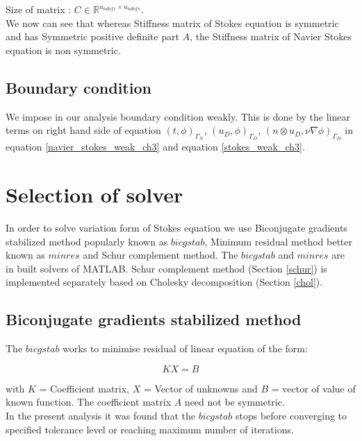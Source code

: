 \documentclass[a4paper]{book}
\begin{document}
Size of matrix : $C \in \mathbb{R}^{u_{ndofs} \times u_{ndofs}}$. \\

We now can see that whereas Stiffness matrix of Stokes equation is symmetric and has Symmetric positive definite part $A$, the Stiffness matrix of Navier Stokes equation is non symmetric.

\subsection{Boundary condition}

We impose in our analysis boundary condition weakly. This is done by the linear terms on right hand side of equation  $(t,\phi)_{\Gamma_N}$, $(u_D,\phi)_{\Gamma_D}$, \linebreak $(n \otimes u_D, \nu \nabla \phi)_{\Gamma_D}$ in equation \ref{navier_stokes_weak_ch3} and equation \ref{stokes_weak_ch3}.

\section{Selection of solver}

In order to solve variation form of Stokes equation we use Biconjugate gradients stabilized method popularly known as $bicgstab$, Minimum residual method better known as $minres$ and Schur complement method. The $bicgstab$ and $minres$ are in built solvers of MATLAB. Schur complement method (Section \ref{schur}) is implemented separately based on Cholesky decomposition (Section \ref{chol}).

\subsection{Biconjugate gradients stabilized method}

The $bicgstab$ works to minimise residual of linear equation of the form:

\begin{equation} \label{linear_matrix_equation}
KX = B
\end{equation}

with $K$ = Coefficient matrix, $X$ = Vector of unknowns and $B$ = vector of value of known function. The coefficient matrix $A$ need not be symmetric. \\

In the present analysis it was found that the $bicgstab$ stops before converging to specified tolerance level or reaching maximum number of iterations. 
\end{document}
